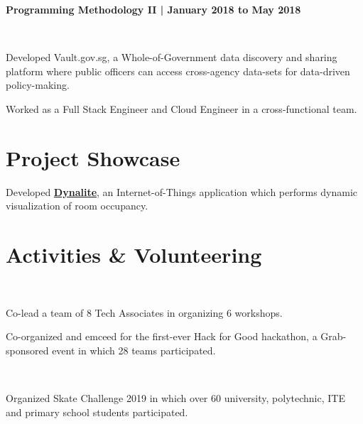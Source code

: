 \documentclass[a4paper]{resume-template} %
\begin{document}
\begin{minipage}[t]{0.60\textwidth}
\begin{tightemize}
\item {\fontsize{10}{10}\selectfont\bfseries Programming Methodology II | January 2018 to May 2018}
\end{tightemize}
\sectionsep
{}\\
\begin{tightemize}
\item Developed Vault.gov.sg, a Whole-of-Government data discovery and sharing platform where public officers can access cross-agency data-sets for data-driven policy-making.
\item Worked as a Full Stack Engineer and Cloud Engineer in a cross-functional team.
\end{tightemize}
\sectionsep


\section{Project Showcase}
\begin{tightemize}
\item Developed {\bf \href{https://github.com/digipie/dynalite}{Dynalite}}, an Internet-of-Things application which performs dynamic visualization of room occupancy.
\end{tightemize}
\sectionsep

\section{Activities \& Volunteering}
\\
\begin{tightemize}
\item Co-lead a team of 8 Tech Associates in organizing 6 workshops.
\item Co-organized and emceed for the first-ever Hack for Good hackathon, a Grab-sponsored event in which 28 teams participated.
\end{tightemize}
\sectionsep

\\
\begin{tightemize}
\item Organized Skate Challenge 2019 in which over 60 university, polytechnic, ITE and primary school students participated.
\end{tightemize}
\sectionsep


\end{minipage}
\end{document}
